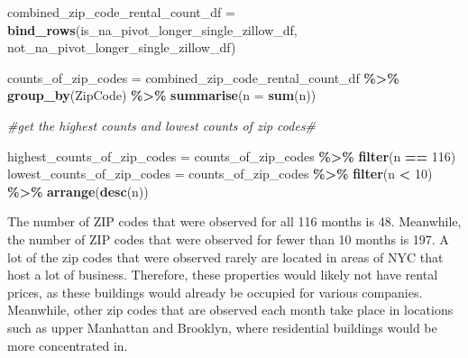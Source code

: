 \documentclass[
]{article}
\newenvironment{Shaded}{\begin{snugshade}}{\end{snugshade}}
\newcommand{\AttributeTok}[1]{\textcolor[rgb]{0.13,0.29,0.53}{#1}}
\newcommand{\CommentTok}[1]{\textcolor[rgb]{0.56,0.35,0.01}{\textit{#1}}}
\newcommand{\DecValTok}[1]{\textcolor[rgb]{0.00,0.00,0.81}{#1}}
\newcommand{\FunctionTok}[1]{\textcolor[rgb]{0.13,0.29,0.53}{\textbf{#1}}}
\newcommand{\NormalTok}[1]{#1}
\newcommand{\OtherTok}[1]{\textcolor[rgb]{0.56,0.35,0.01}{#1}}
\newcommand{\SpecialCharTok}[1]{\textcolor[rgb]{0.81,0.36,0.00}{\textbf{#1}}}
\begin{document}
\begin{Shaded}
\begin{Highlighting}[]
\NormalTok{combined\_zip\_code\_rental\_count\_df }\OtherTok{=} \FunctionTok{bind\_rows}\NormalTok{(is\_na\_pivot\_longer\_single\_zillow\_df, not\_na\_pivot\_longer\_single\_zillow\_df)}

\NormalTok{counts\_of\_zip\_codes }\OtherTok{=}\NormalTok{ combined\_zip\_code\_rental\_count\_df }\SpecialCharTok{\%\textgreater{}\%} \FunctionTok{group\_by}\NormalTok{(ZipCode) }\SpecialCharTok{\%\textgreater{}\%}
  \FunctionTok{summarise}\NormalTok{(}\AttributeTok{n =} \FunctionTok{sum}\NormalTok{(n))}

\CommentTok{\#get the highest counts and lowest counts of zip codes\#}

\NormalTok{highest\_counts\_of\_zip\_codes }\OtherTok{=}\NormalTok{ counts\_of\_zip\_codes }\SpecialCharTok{\%\textgreater{}\%} \FunctionTok{filter}\NormalTok{(n }\SpecialCharTok{==} \DecValTok{116}\NormalTok{)}
\NormalTok{lowest\_counts\_of\_zip\_codes }\OtherTok{=}\NormalTok{ counts\_of\_zip\_codes }\SpecialCharTok{\%\textgreater{}\%} \FunctionTok{filter}\NormalTok{(n }\SpecialCharTok{\textless{}} \DecValTok{10}\NormalTok{) }\SpecialCharTok{\%\textgreater{}\%} \FunctionTok{arrange}\NormalTok{(}\FunctionTok{desc}\NormalTok{(n))}
\end{Highlighting}
\end{Shaded}

The number of ZIP codes that were observed for all 116 months is 48.
Meanwhile, the number of ZIP codes that were observed for fewer than 10
months is 197. A lot of the zip codes that were observed rarely are
located in areas of NYC that host a lot of business. Therefore, these
properties would likely not have rental prices, as these buildings would
already be occupied for various companies. Meanwhile, other zip codes
that are observed each month take place in locations such as upper
Manhattan and Brooklyn, where residential buildings would be more
concentrated in.
\end{document}
